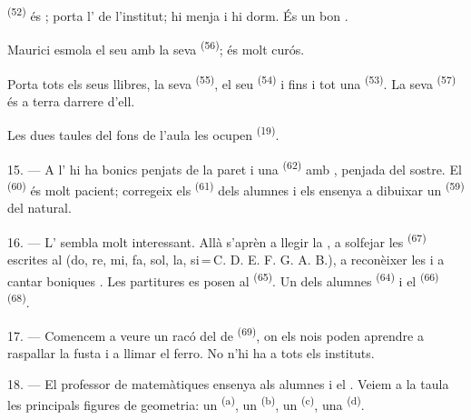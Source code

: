  \textsuperscript{(52)} és ; porta l'
de l'institut; hi menja i hi dorm. És un bon .

Maurici esmola el seu  amb la seva 
\textsuperscript{(56)}; és molt curós.

Porta tots els seus llibres, la seva  \textsuperscript{(55)},
el seu  \textsuperscript{(54)} i fins i tot una
 \textsuperscript{(53)}. La seva  \textsuperscript{(57)} és a terra darrere d'ell.

Les dues taules del fons de l'aula les ocupen 
\textsuperscript{(19)}.

\VUsaut{4.6mm}
\VUsaut{3.4mm}

15. --- A l' hi ha bonics  penjats de la
paret i una  \textsuperscript{(62)} amb ,
penjada del sostre. El  \textsuperscript{(60)} és molt
pacient; corregeix els  \textsuperscript{(61)} dels alumnes i
els ensenya a dibuixar un  \textsuperscript{(59)} del natural.

16. --- L' sembla molt interessant. Allà s'aprèn a llegir
la , a solfejar les 
\textsuperscript{(67)} escrites al  (do, re, mi, fa, sol, la,
si\,=\,C. D. E. F. G. A. B.), a reconèixer les  i a cantar boniques
. Les partitures es posen al 
\textsuperscript{(65)}. Un dels alumnes 
\textsuperscript{(64)} i el  \textsuperscript{(66)}
 \textsuperscript{(68)}.

17. --- Comencem a veure un racó del  de  \textsuperscript{(69)}, on els nois poden aprendre a raspallar la fusta
i a llimar el ferro. No n'hi ha a tots els instituts.

\VUsaut{5.0mm}
\VUsaut{3.6mm}

18. --- El professor de matemàtiques ensenya als alumnes  i el . Veiem a la taula les principals
figures de geometria: un  \textsuperscript{(a)}, un
 \textsuperscript{(b)}, un 
\textsuperscript{(c)}, una  \textsuperscript{(d)}.

